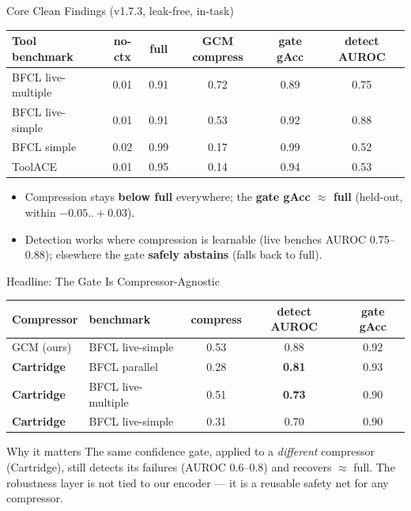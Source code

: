 \begin{frame}{Core Clean Findings (v1.7.3, leak-free, in-task)}
  \small
  \begin{table}
    \centering
    \begin{tabular}{lccccc}
      \toprule
      Tool benchmark & no-ctx & full & GCM compress & gate gAcc & detect AUROC \\
      \midrule
      BFCL live-multiple & 0.01 & 0.91 & 0.72 & 0.89 & 0.75 \\
      BFCL live-simple   & 0.01 & 0.91 & 0.53 & 0.92 & 0.88 \\
      BFCL simple        & 0.02 & 0.99 & 0.17 & 0.99 & 0.52 \\
      ToolACE            & 0.01 & 0.95 & 0.14 & 0.94 & 0.53 \\
      \bottomrule
    \end{tabular}
  \end{table}
  \vspace{-0.2em}
  \begin{itemize}
    \item Compression stays \textbf{below full} everywhere; the \textbf{gate gAcc $\approx$ full}
      (held-out, within $-0.05 .. +0.03$).
    \item Detection works where compression is learnable (live benches AUROC 0.75--0.88);
      elsewhere the gate \textbf{safely abstains} (falls back to full).
  \end{itemize}
\end{frame}

\begin{frame}{Headline: The Gate Is Compressor-Agnostic}
  \small
  \begin{table}
    \centering
    \begin{tabular}{llccc}
      \toprule
      Compressor & benchmark & compress & detect AUROC & gate gAcc \\
      \midrule
      GCM (ours)         & BFCL live-simple   & 0.53 & 0.88 & 0.92 \\
      \textbf{Cartridge} & BFCL parallel      & 0.28 & \textbf{0.81} & 0.93 \\
      \textbf{Cartridge} & BFCL live-multiple & 0.51 & \textbf{0.73} & 0.90 \\
      \textbf{Cartridge} & BFCL live-simple   & 0.31 & 0.70 & 0.90 \\
      \bottomrule
    \end{tabular}
  \end{table}
  \begin{block}{Why it matters}
    The same confidence gate, applied to a \emph{different} compressor (Cartridge), still
    detects its failures (AUROC 0.6--0.8) and recovers $\approx$ full. The robustness layer is
    not tied to our encoder --- it is a reusable safety net for any compressor.
  \end{block}
\end{frame}

